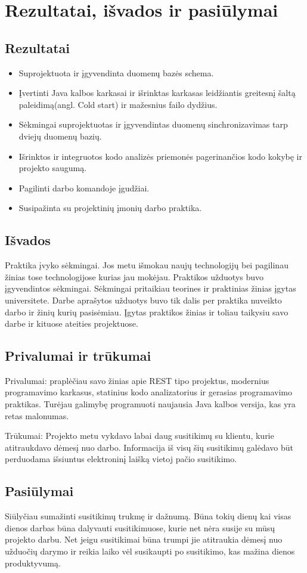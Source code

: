 \documentclass{VUMIFPSkursinis}
\begin{document}
		
\section{Rezultatai, išvados ir pasiūlymai}
	\subsection{Rezultatai}
		\begin{itemize}
			\item{Suprojektuota ir įgyvendinta duomenų bazės schema.}
			\item{Įvertinti Java kalbos karkasai ir išrinktas karkasas leidžiantis greitesnį šaltą paleidimą(angl. Cold start) ir mažesnius failo dydžius.}
			\item{Sėkmingai suprojektuotas ir įgyvendintas duomenų sinchronizavimas tarp dviejų duomenų bazių.}
			\item{Išrinktos ir integruotos kodo analizės priemonės pagerinančios kodo kokybę ir projekto saugumą.}
			\item{Pagilinti darbo komandoje įgudžiai.}
			\item{Susipažinta su projektinių įmonių darbo praktika.}
		\end{itemize}
		
	\subsection{Išvados}
		Praktika įvyko sėkmingai. Jos metu išmokau naujų technologijų bei pagilinau žinias tose technologijose kurias jau mokėjau. 
		Praktikos užduotys buvo įgyvendintos sėkmingai. Sėkmingai pritaikiau teorines ir praktinias žinias įgytas universitete.
		Darbe aprašytos užduotys buvo tik dalis per praktika nuveikto darbo ir žinių kurių pasisėmiau.
		Įgytas praktikos žinias ir toliau taikysiu savo darbe ir kituose ateities projektuose.
		
	\subsection{Privalumai ir trūkumai}
		Privalumai: praplėčiau savo žinias apie REST tipo projektus, modernius programavimo karkasus, statinius kodo analizatorius ir gerasias programavimo
		praktikas. Turėjau galimybę programuoti naujausia Java kalbos versija, kas yra retas malonumas.  

		Trūkumai: Projekto metu vykdavo labai daug susitikimų su klientu, kurie atitraukdavo dėmesį nuo darbo. Informacija iš visų šių susitikimų galėdavo būt perduodama išsiuntus elektroninį laišką vietoj pačio susitikimo.

	\subsection{Pasiūlymai}
		Siūlyčiau sumažinti susitikimų trukmę ir dažnumą. Būna tokių dienų kai visas dienos darbas būna dalyvauti susitikimuose, kurie net nėra susije su mūsų 
		projekto darbu. Net jeigu susitikimai būna trumpi jie atitraukia dėmesį nuo užduočių darymo ir reikia laiko vėl susikaupti po susitikimo, kas mažina dienos produktyvumą.
		
\printbibliography[heading=bibintoc]
\end{document}

